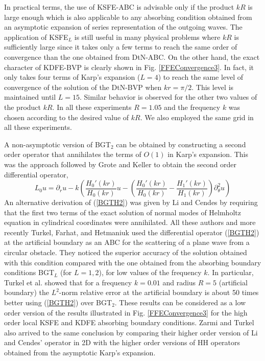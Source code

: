 \documentclass[final,3p,times,12pt]{elsarticle}
\begin{document}
In practical terms, the use of KSFE-ABC is advisable only if the product $kR$ is large enough which is also applicable to any absorbing condition obtained from an asymptotic expansion of series representation of the outgoing waves.  The application of KSFE$_L$  is still useful in many physical problems where $kR$ is sufficiently large
since it takes only a few terms to reach the same order of convergence than the one obtained from DtN-ABC.
On the other hand, the exact character of KDFE-BVP is clearly shown in Fig. \ref{FFEConvergence3}. In fact, it only takes four terms of Karp's expansion ($L=4$) to reach the same level of convergence of the solution of the DtN-BVP when $kr=\pi/2$. This level is maintained until $L=15$. Similar behavior is observed for the other two values of the product $kR$. In all these experiments $R=1.05$ and the frequency $k$ was chosen according to the desired value of $kR$. We also employed the same grid in all these experiments. 

A non-asymptotic version of BGT$_2$ can be obtained by constructing  a second order operator that annihilates 
the terms of $O \left( 1\right)$  in 
Karp's expansion. This was the approach followed by Grote and Keller \cite{Grote-Keller01}  to obtain the second order differential operator,
\begin{equation}
L_0u = \partial_r u - k \left( \frac{H_0'(kr)}{H_0(kr)}u - \left(\frac{H_0'(kr)}{H_0(kr)} -\frac{H_1'(kr)}{H_1(kr)}\right)\partial_{\theta}^2 u\right)\label{BGTH2}
\end{equation}
 An alternative derivation of (\ref{BGTH2}) was given by Li and Cendes \cite{Li-Cendes} by requiring that the first two terms of the exact solution of normal modes of Helmholtz equation in cylindrical coordinates were annihilated.  All these authors and more recently Turkel, Farhat, and Hetmaniuk \cite{Turkel-Farhat2004} used the differential operator (\ref{BGTH2}) at the artificial boundary as an ABC for the scattering of a plane wave from a circular obstacle. They noticed the superior accuracy of the solution obtained with this condition compared with the one obtained from the absorbing boundary conditions  BGT$_L$  (for $L=1,2$),
  for low values of the frequency $k$. In particular,  Turkel et al. \cite{Turkel-Farhat2004} showed that for a frequency $k=0.01$ and radius $R=5$ (artificial boundary)  the $L^2$-norm relative error at the artificial boundary  is about 50 times better using (\ref{BGTH2}) over BGT$_2$.
  These results can be considered as a low order version of the results illustrated in Fig. \ref{FFEConvergence3} for the high order local KSFE and KDFE absorbing boundary conditions.  Zarmi and Turkel \cite{Zarmi-Turkel} also arrived to the same conclusion by comparing their higher order version of Li and Cendes' operator in 2D  with the higher order versions of HH operators obtained from the asymptotic Karp's expansion.
\end{document}

